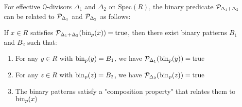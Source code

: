 \begin{proposition}\label{prop:binary-predicate-decomposition}
For effective $\mathbb{Q}$-divisors $\Delta_1$ and $\Delta_2$ on $\text{Spec}(R)$, the binary predicate $\mathcal{P}_{\Delta_1+\Delta_2}$ can be related to $\mathcal{P}_{\Delta_1}$ and $\mathcal{P}_{\Delta_2}$ as follows:

If $x \in R$ satisfies $\mathcal{P}_{\Delta_1+\Delta_2}(\operatorname{bin}_p(x)) = \text{true}$, then there exist binary patterns $B_1$ and $B_2$ such that:
\begin{enumerate}
    \item For any $y \in R$ with $\operatorname{bin}_p(y) = B_1$, we have $\mathcal{P}_{\Delta_1}(\operatorname{bin}_p(y)) = \text{true}$
    \item For any $z \in R$ with $\operatorname{bin}_p(z) = B_2$, we have $\mathcal{P}_{\Delta_2}(\operatorname{bin}_p(z)) = \text{true}$
    \item The binary patterns satisfy a "composition property" that relates them to $\operatorname{bin}_p(x)$
\end{enumerate}
\end{proposition}

